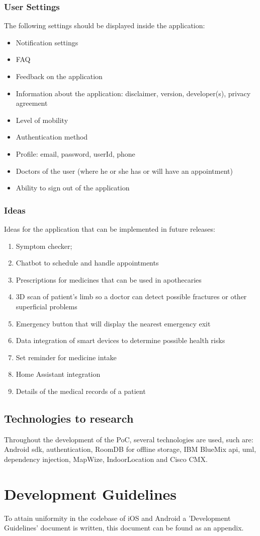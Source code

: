 \subsubsection{User Settings}
The following settings should be displayed inside the application:
\begin{itemize}
\item Notification settings
\item FAQ
\item Feedback on the application
\item Information about the application: disclaimer, version, developer(s), privacy agreement
\item Level of mobility
\item Authentication method
\item Profile: email, password, userId, phone
\item Doctors of the user (where he or she has or will have an appointment)
\item Ability to sign out of the application
\end{itemize}
\subsubsection{Ideas}
Ideas for the application that can be implemented in future releases:
\begin{enumerate}
\item Symptom checker;
\item Chatbot to schedule and handle appointments
\item Prescriptions for medicines that can be used in apothecaries
\item 3D scan of patient's limb so a doctor can detect possible fractures or other superficial problems
\item Emergency button that will display the nearest emergency exit
\item Data integration of smart devices to determine possible health risks
\item Set reminder for medicine intake
\item Home Assistant integration
\item Details of the medical records of a patient
\end{enumerate}
\subsection{Technologies to research}
Throughout the development of the PoC, several technologies are used, such are: Android \acrshort{sdk}, authentication, RoomDB for offline storage, IBM BlueMix \acrshort{api}, \acrfull{uml}, dependency injection, MapWize, IndoorLocation and Cisco CMX.
\section{Development Guidelines}
To attain uniformity in the codebase of iOS and Android a 'Development Guidelines' document is written, this document can be found as an appendix.
